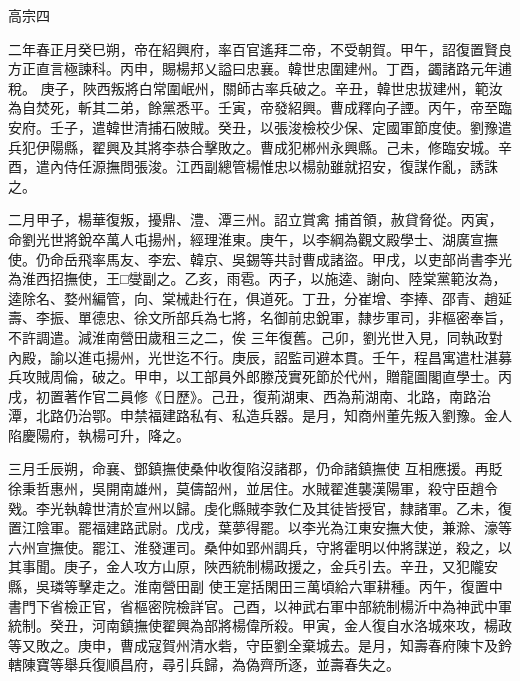 
\begin{pinyinscope}

 高宗四



 二年春正月癸巳朔，帝在紹興府，率百官遙拜二帝，不受朝賀。甲午，詔復置賢良方正直言極諫科。丙申，賜楊邦乂謚曰忠襄。韓世忠圍建州。丁酉，蠲諸路元年逋稅。
 庚子，陜西叛將白常圍岷州，關師古率兵破之。辛丑，韓世忠拔建州，範汝為自焚死，斬其二弟，餘黨悉平。壬寅，帝發紹興。曹成釋向子諲。丙午，帝至臨安府。壬子，遣韓世清捕石陂賊。癸丑，以張浚檢校少保、定國軍節度使。劉豫遣兵犯伊陽縣，翟興及其將李恭合擊敗之。曹成犯郴州永興縣。己未，修臨安城。辛酉，遣內侍任源撫問張浚。江西副總管楊惟忠以楊勍雖就招安，復謀作亂，誘誅之。



 二月甲子，楊華復叛，擾鼎、澧、潭三州。詔立賞禽
 捕首領，赦貸脅從。丙寅，命劉光世將銳卒萬人屯揚州，經理淮東。庚午，以李綱為觀文殿學士、湖廣宣撫使。仍命岳飛率馬友、李宏、韓京、吳錫等共討曹成諸盜。甲戌，以吏部尚書李光為淮西招撫使，王□燮副之。乙亥，雨雹。丙子，以施逵、謝向、陸棠黨範汝為，逵除名、婺州編管，向、棠械赴行在，俱道死。丁丑，分崔增、李捧、邵青、趙延壽、李振、單德忠、徐文所部兵為七將，名御前忠銳軍，隸步軍司，非樞密奉旨，不許調遣。減淮南營田歲租三之二，俟
 三年復舊。己卯，劉光世入見，同執政對內殿，諭以進屯揚州，光世迄不行。庚辰，詔監司避本貫。壬午，程昌寓遣杜湛募兵攻賊周倫，破之。甲申，以工部員外郎滕茂實死節於代州，贈龍圖閣直學士。丙戌，初置著作官二員修《日歷》。己丑，復荊湖東、西為荊湖南、北路，南路治潭，北路仍治鄂。申禁福建路私有、私造兵器。是月，知商州董先叛入劉豫。金人陷慶陽府，執楊可升，降之。



 三月壬辰朔，命襄、鄧鎮撫使桑仲收復陷沒諸郡，仍命諸鎮撫使
 互相應援。再貶徐秉哲惠州，吳開南雄州，莫儔韶州，並居住。水賊翟進襲漢陽軍，殺守臣趙令戣。李光執韓世清於宣州以歸。虔化縣賊李敦仁及其徒皆授官，隸諸軍。乙未，復置江陰軍。罷福建路武尉。戊戌，葉夢得罷。以李光為江東安撫大使，兼滁、濠等六州宣撫使。罷江、淮發運司。桑仲如郢州調兵，守將霍明以仲將謀逆，殺之，以其事聞。庚子，金人攻方山原，陜西統制楊政援之，金兵引去。辛丑，又犯隴安縣，吳璘等擊走之。淮南營田副
 使王寔括閑田三萬頃給六軍耕種。丙午，復置中書門下省檢正官，省樞密院檢詳官。己酉，以神武右軍中部統制楊沂中為神武中軍統制。癸丑，河南鎮撫使翟興為部將楊偉所殺。甲寅，金人復自水洛城來攻，楊政等又敗之。庚申，曹成寇賀州清水砦，守臣劉全棄城去。是月，知壽春府陳卞及鈐轄陳寶等舉兵復順昌府，尋引兵歸，為偽齊所逐，並壽春失之。




\end{pinyinscope}
